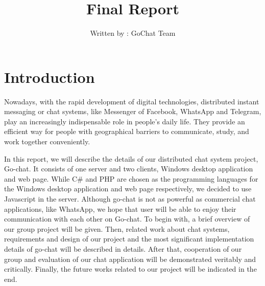 \documentclass[a4paper,11pt]{article}
\title{Final Report}
\author{Written by : GoChat Team}
\begin{document}
\maketitle


\section{Introduction}
Nowadays, with the rapid development of digital technologies, distributed instant messaging or chat systems, like Messenger of Facebook, WhatsApp and Telegram, play an increasingly indispensable role in people’s daily life. They provide an efficient way for people with geographical barriers to communicate, study, and work together conveniently.

In this report, we will describe the details of  our distributed chat system project, Go-chat. It consists of one server and two clients, Windows desktop application and web page. While C\# and PHP are chosen as the programming languages for the Windows desktop application and web page respectively, we decided to use Javascript in the server. Although go-chat is not as powerful as commercial chat applications, like WhatsApp, we hope that user will be able to enjoy their communication with each other on Go-chat. To begin with, a brief overview of our group project will be given. Then, related work about chat systems, requirements and design of our project and the most significant implementation details of go-chat will be described in details. After that, cooperation of our group and evaluation of our chat application will be demonstrated veritably and critically. Finally, the future works related to our project will be indicated in the end.






\end{document}
